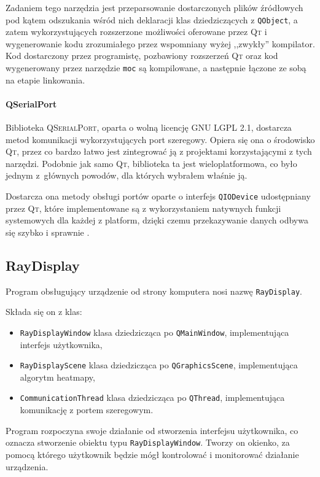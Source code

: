 Zadaniem tego narzędzia jest przeparsowanie dostarczonych plików źródłowych pod kątem odszukania wśród nich deklaracji klas dziedziczących z \verb|QObject|, a zatem wykorzystujących rozszerzone możliwości oferowane przez \textsc{Qt} i wygenerowanie kodu zrozumiałego przez wspomniany wyżej ,,zwykły'' kompilator.
Kod dostarczony przez programistę, pozbawiony rozszerzeń \textsc{Qt} oraz kod wygenerowany przez narzędzie \texttt{moc} są kompilowane, a następnie łączone ze sobą na etapie linkowania.

\paragraph{QSerialPort}
Biblioteka \textsc{QSerialPort}, oparta o wolną licencję \textsc{GNU LGPL 2.1}, dostarcza metod komunikacji wykorzystujących port szeregowy.
Opiera się ona o środowisko \textsc{Qt}, przez co bardzo łatwo jest zintegrować ją z projektami korzystającymi z tych narzędzi.
Podobnie jak samo \textsc{Qt}, biblioteka ta jest wieloplatformowa, co było jednym z~głównych powodów, dla których wybrałem właśnie ją.

Dostarcza ona metody obsługi portów oparte o interfejs \verb|QIODevice| udostępniany przez \textsc{Qt}, które implementowane są z wykorzystaniem natywnych funkcji systemowych dla każdej z platform, dzięki czemu przekazywanie danych odbywa się szybko i sprawnie \citep{QSP}.

\subsection{RayDisplay}

Program obsługujący urządzenie od strony komputera nosi nazwę \texttt{RayDisplay}.

Składa się on z klas:
\begin{itemize}
 \item \verb|RayDisplayWindow| \pauza klasa dziedzicząca po \verb|QMainWindow|, implementująca interfejs użytkownika,
 \item \verb|RayDisplayScene| \pauza klasa dziedzicząca po \verb|QGraphicsScene|, implementująca algorytm heatmapy,
 \item \verb|CommunicationThread| \pauza klasa dziedzicząca po \verb|QThread|, implementująca komunikację z portem szeregowym.\\
\end{itemize}

Program rozpoczyna swoje działanie od stworzenia interfejsu użytkownika, co oznacza stworzenie obiektu typu \verb|RayDisplayWindow|.
Tworzy on okienko, za pomocą którego użytkownik będzie mógł kontrolować i monitorować działanie urządzenia.

